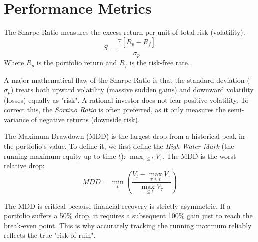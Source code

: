 \section{Performance Metrics}

\begin{definition}
The Sharpe Ratio measures the excess return per unit of total risk (volatility).
\[ 
    S = \frac{\mathbb{E}[R_p - R_f]}{\sigma_p} 
\]
Where \(R_p\) is the portfolio return and \(R_f\) is the risk-free rate.
\end{definition}

\begin{remark}
A major mathematical flaw of the Sharpe Ratio is that the standard deviation (\(\sigma_p\)) treats both upward volatility (massive sudden gains) and downward volatility (losses) equally as "risk". A rational investor does not fear positive volatility. To correct this, the \textit{Sortino Ratio} is often preferred, as it only measures the semi-variance of negative returns (downside risk).
\end{remark}

\begin{definition}
The Maximum Drawdown (MDD) is the largest drop from a historical peak in the portfolio's value. To define it, we first define the \textit{High-Water Mark} (the running maximum equity up to time \(t\)): \(\max_{\tau \le t} V_\tau\).
The MDD is the worst relative drop:
\[ 
    MDD = \min_{t} \left( \frac{V_t - \max_{\tau \le t} V_\tau}{\max_{\tau \le t} V_\tau} \right) 
\]
\end{definition}

\begin{remark}
The MDD is critical because financial recovery is strictly asymmetric. If a portfolio suffers a 50\% drop, it requires a subsequent 100\% gain just to reach the break-even point. This is why accurately tracking the running maximum reliably reflects the true "risk of ruin".
\end{remark}
